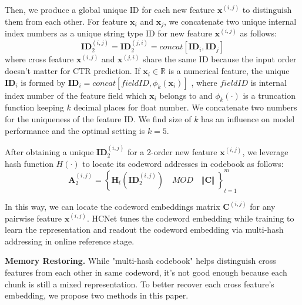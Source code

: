 \documentclass[sigconf,authorversion]{acmart}
\begin{document}
Then, we produce a global unique ID for each new feature $\mathbf{x}^{(i,j)}$ to distinguish them from each other. For feature $\mathbf{x}_i$ and $\mathbf{x}_j$, we concatenate two unique internal index numbers as a unique string type ID for new feature $\mathbf{x}^{(i,j)}$ as follows:
\begin{equation}
  \mathbf{ID}_{2}^{(i,j)} = \mathbf{ID}_2^{\left(j,i\right)} = concat[\mathbf{ID}_i,\mathbf{ID}_j]
\end{equation}
where cross feature $\mathbf{x}^{(i,j)}$ and $\mathbf{x}^{(j,i)}$ share the same ID because the input order doesn't matter for CTR prediction. If  $\mathbf{x}_i \in \mathbb{R}$ is a numerical feature, the unique $\mathbf{ID}_i$  is formed by $\mathbf{ID}_i=concat[fieldID,\phi_k(\mathbf{x}_i)]$ , where $fieldID$ is internal index number of the feature field which $\mathbf{x}_i$ belongs to and $\phi_k(\cdot)$ is a truncation function keeping $k$ decimal places for float number. We concatenate two numbers for the uniqueness of the feature ID. We find size of $k$ has an influence on model performance and the optimal setting is $k=5$.

After obtaining a unique $\mathbf{ID}_2^{(i,j)}$ for a 2-order new feature $\mathbf{x}^{(i,j)}$, we leverage hash function  $H(\cdot)$ to locate its codeword addresses in codebook as follows:
\begin{equation}
  \mathbf{A}_2^{(i,j)} = \left\{ \mathbf{H}_t(\mathbf{ID}_2^{(i,j)}) \quad MOD \quad \Vert \mathbf{C} \Vert\ \right\}_{t=1}^{m}
\end{equation}

In this way, we can locate the codeword embeddings matrix $\mathbf{C}^{(i,j)}$ for any pairwise feature $\mathbf{x}^{(i,j)}$. HCNet tunes the codeword embedding while training to learn the representation and readout the codeword embedding via multi-hash addressing in online reference stage.

\textbf{Memory Restoring.}
While "multi-hash codebook" helps distinguish cross features from each other in same codeword, it's not good enough because each chunk is still a mixed representation. To better recover each cross feature's embedding, we propose two methods in this paper.
\end{document}
